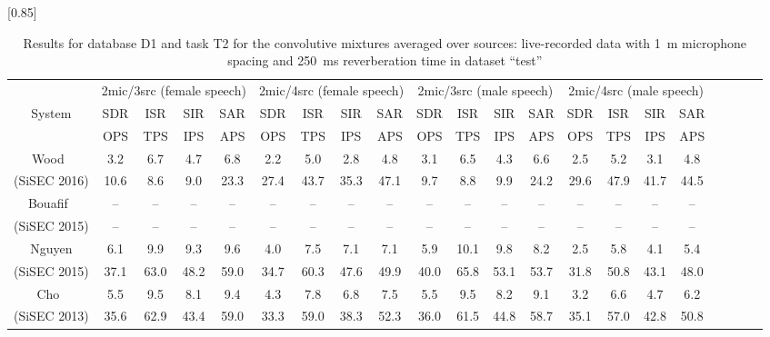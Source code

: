 \documentclass{article}
\begin{document}
\begin{table*}[t]
	\caption{Results for database D1 and task T2 for the convolutive mixtures averaged over sources: 
live-recorded data with 1~m microphone spacing and 250~ms reverberation time in dataset ``test''}
	\vspace{-5pt}
	\begin{center}
	\scalebox{0.85}[0.85]{ %
		\begin{tabular}{|c|cccc|cccc|cccc|cccc|cccc|} \hline
			\multicolumn{1}{|c|}{}					& \multicolumn{4}{c|}{2mic/3src (female speech)}	& \multicolumn{4}{c|}{2mic/4src (female speech)}	& \multicolumn{4}{c|}{2mic/3src (male speech)} & \multicolumn{4}{c|}{2mic/4src (male speech)}\\
			\multicolumn{1}{|c|}{System}				&	SDR	&	ISR	& SIR	&	SAR			&	SDR	&	ISR &	SIR	&	SAR			&	SDR	&	ISR	&	SIR	&	SAR		&	SDR	&	ISR	&	SIR	&	SAR	\\
			\multicolumn{1}{|c|}{}					&	OPS	&	TPS	&	IPS	&	APS			&	OPS	&	TPS	&	IPS	&	APS			&	OPS	&	TPS	&	IPS	&	APS		&	OPS	&	TPS	&	IPS	&	APS	\\ \hline \hline
			\multirow{1}{*}{Wood~\cite{Wood}}		&	3.2	&	6.7	&	4.7	&	6.8			&	2.2	&	5.0	&	2.8	&	4.8			&	3.1	&	6.5	&	4.3	&	6.6		&	2.5	&	5.2	&	3.1	&	4.8	\\
			\multirow{1}{*}{(SiSEC 2016)}			&	10.6	&	8.6	&	9.0	&	23.3			&	27.4	&	43.7	&	35.3	&	47.1			&	9.7	&	8.8	&	9.9	&	24.2		&	29.6	&	47.9	&	41.7	&	44.5	\\ \hline
			\multirow{1}{*}{Bouafif~\cite{Bouafif}}		&	--	&	--	&	--	&	--			&	--	&	--	&	--	&	--			&	--	&	--	&	--	&	--		&	--	&	--	&	--	&	--	\\
			\multirow{1}{*}{(SiSEC 2015)}			&	--	&	--	&	--	&	--			&	--	&	--	&	--	&	--			&	--	&	--	&	--	&	--		&	--	&	--	&	--	&	--	\\ \hline
			\multirow{1}{*}{Nguyen}					&	6.1	&	9.9	&	9.3	&	9.6			&	4.0	&	7.5	&	7.1	&	7.1			&	5.9	&	10.1	&	9.8	&	8.2		&	2.5	&	5.8	&	4.1	&	5.4	\\
			\multirow{1}{*}{(SiSEC 2015)}			&	37.1	&	63.0	&	48.2	&	59.0			&	34.7	&	60.3	&	47.6	&	49.9			&	40.0	&	65.8	&	53.1	&	53.7		&	31.8	&	50.8	&	43.1	&	48.0	\\ \hline
			\multirow{1}{*}{Cho~\cite{Cho1}}			&	5.5	&	9.5	&	8.1	&	9.4			&	4.3	&	7.8	&	6.8	&	7.5			&	5.5	&	9.5	&	8.2	&	9.1		&	3.2	&	6.6	&	4.7	&	6.2	\\
			\multirow{1}{*}{(SiSEC 2013)}			&	35.6	&	62.9	&	43.4	&	59.0			&	33.3	&	59.0	&	38.3	&	52.3			&	36.0	&	61.5	&	44.8	&	58.7		&	35.1	&	57.0	&	42.8	&	50.8	\\ \hline

\end{tabular}}
\end{center}
\end{table*}
\end{document}
